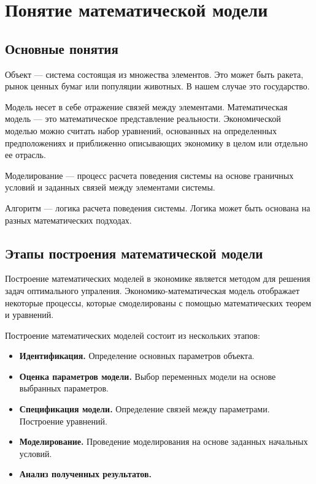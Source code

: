\chapter{Понятие математической модели}
\label{cha:definition}

\section{Основные понятия}

Объект --- система состоящая из множества элементов.
Это может быть ракета, рынок ценных бумаг или популяции животных.
В нашем случае это государство.

Модель несет в себе отражение связей между элементами.
Математическая модель --- это математическое представление реальности.
Экономической моделью можно считать набор уравнений, основанных на определенных предположениях и приближенно описывающих экономику в целом или отдельно ее отрасль.

Моделирование --- процесс расчета поведения системы на основе граничных условий и заданных связей между элементами системы.

Алгоритм --- логика расчета поведения системы.
Логика может быть основана на разных математических подходах.

\section{Этапы построения математической модели}

Построение математических моделей в экономике является методом для решения задач оптимального упраления.
Экономико-математическая модель отображает некоторые процессы, которые смоделированы с помощью математических теорем и уравнений.

Построение математических моделей состоит из нескольких этапов:
\begin{itemize}
	\item \textbf{Идентификация.}
	Определение основных параметров объекта.
	\item \textbf{Оценка параметров модели.}
	Выбор переменных модели на основе выбранных параметров.
	\item \textbf{Спецификация модели.}
	Определение связей между параметрами.
	Построение уравнений.
	\item \textbf{Моделирование.}
	Проведение моделирования на основе заданных начальных условий.
	\item \textbf{Анализ полученных результатов.}
\end{itemize}

